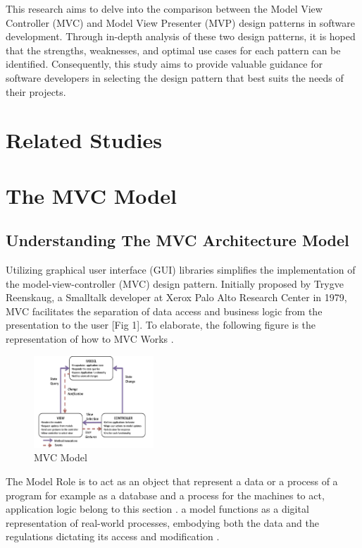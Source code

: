 \documentclass[conference]{IEEEtran}
\begin{document}
This research aims to delve into the comparison between the Model View Controller (MVC) and Model View Presenter (MVP) design patterns in software development. Through in-depth analysis of these two design patterns, it is hoped that the strengths, weaknesses, and optimal use cases for each pattern can be identified. Consequently, this study aims to provide valuable guidance for software developers in selecting the design pattern that best suits the needs of their projects.

\section{Related Studies}
\section*{The MVC Model}
\subsection{Understanding The MVC Architecture Model}

Utilizing graphical user interface (GUI) libraries simplifies the implementation of the model-view-controller (MVC) design pattern. Initially proposed by Trygve Reenskaug, a Smalltalk developer at Xerox Palo Alto Research Center in 1979, MVC facilitates the separation of data access and business logic from the presentation to the user [Fig 1]. To elaborate, the following figure is the representation of how to MVC Works \cite{dey2011comparative}.

\begin{figure}
    \centering
    \includegraphics[width = 0.4\textwidth]{Image/Figure 1.PNG}
    \caption{MVC Model \cite{dey2011comparative}}
    \label{fig:enter-label}
\end{figure}

The Model Role is to act as an object that represent a data or a process of a program for example as a database and a process for the machines to act, application logic belong to this section \cite{thakur2019role}.
a model functions as a digital representation of real-world processes, embodying both the data and the regulations dictating its access and modification \cite{dey2011comparative}.
\end{document}
